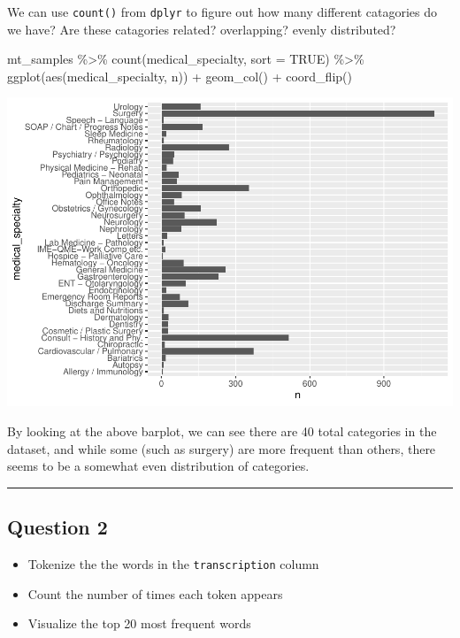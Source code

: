 \documentclass[
]{article}
\newenvironment{Shaded}{\begin{snugshade}}{\end{snugshade}}
\newcommand{\AttributeTok}[1]{\textcolor[rgb]{0.77,0.63,0.00}{#1}}
\newcommand{\ConstantTok}[1]{\textcolor[rgb]{0.00,0.00,0.00}{#1}}
\newcommand{\FunctionTok}[1]{\textcolor[rgb]{0.00,0.00,0.00}{#1}}
\newcommand{\NormalTok}[1]{#1}
\newcommand{\SpecialCharTok}[1]{\textcolor[rgb]{0.00,0.00,0.00}{#1}}
\providecommand{\tightlist}{%
  \setlength{\itemsep}{0pt}\setlength{\parskip}{0pt}}
\begin{document}
We can use \texttt{count()} from \texttt{dplyr} to figure out how many
different catagories do we have? Are these catagories related?
overlapping? evenly distributed?

\begin{Shaded}
\begin{Highlighting}[]
\NormalTok{mt\_samples }\SpecialCharTok{\%\textgreater{}\%}
  \FunctionTok{count}\NormalTok{(medical\_specialty, }\AttributeTok{sort =} \ConstantTok{TRUE}\NormalTok{) }\SpecialCharTok{\%\textgreater{}\%}
  \FunctionTok{ggplot}\NormalTok{(}\FunctionTok{aes}\NormalTok{(medical\_specialty, n)) }\SpecialCharTok{+}
  \FunctionTok{geom\_col}\NormalTok{() }\SpecialCharTok{+} 
  \FunctionTok{coord\_flip}\NormalTok{()}
\end{Highlighting}
\end{Shaded}

\includegraphics{lab08-text-mining_files/figure-latex/unnamed-chunk-3-1.pdf}

By looking at the above barplot, we can see there are 40 total
categories in the dataset, and while some (such as surgery) are more
frequent than others, there seems to be a somewhat even distribution of
categories.

\begin{center}\rule{0.5\linewidth}{0.5pt}\end{center}

\hypertarget{question-2}{%
\subsection{Question 2}\label{question-2}}

\begin{itemize}
\tightlist
\item
  Tokenize the the words in the \texttt{transcription} column
\item
  Count the number of times each token appears
\item
  Visualize the top 20 most frequent words
\end{itemize}
\end{document}
